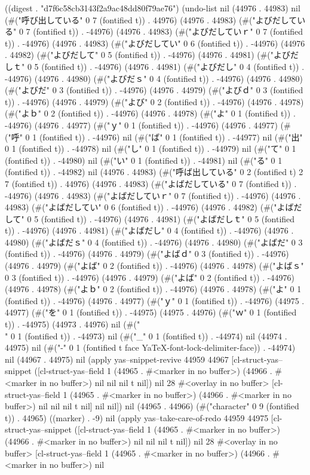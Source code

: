 
((digest . "d7f6c58cb3143f2a9ac48dd80f79ae76") (undo-list nil (44976 . 44983) nil (#("呼び出している" 0 7 (fontified t)) . 44976) (44976 . 44983) (#("よびだしている" 0 7 (fontified t)) . -44976) (44976 . 44983) (#("よびだしていｒ" 0 7 (fontified t)) . -44976) (44976 . 44983) (#("よびだしてい" 0 6 (fontified t)) . -44976) (44976 . 44982) (#("よびだして" 0 5 (fontified t)) . -44976) (44976 . 44981) (#("よびだしｔ" 0 5 (fontified t)) . -44976) (44976 . 44981) (#("よびだし" 0 4 (fontified t)) . -44976) (44976 . 44980) (#("よびだｓ" 0 4 (fontified t)) . -44976) (44976 . 44980) (#("よびだ" 0 3 (fontified t)) . -44976) (44976 . 44979) (#("よびｄ" 0 3 (fontified t)) . -44976) (44976 . 44979) (#("よび" 0 2 (fontified t)) . -44976) (44976 . 44978) (#("よｂ" 0 2 (fontified t)) . -44976) (44976 . 44978) (#("よ" 0 1 (fontified t)) . -44976) (44976 . 44977) (#("ｙ" 0 1 (fontified t)) . -44976) (44976 . 44977) (#("呼" 0 1 (fontified t)) . -44976) nil (#("ば" 0 1 (fontified t)) . -44977) nil (#("出" 0 1 (fontified t)) . -44978) nil (#("し" 0 1 (fontified t)) . -44979) nil (#("て" 0 1 (fontified t)) . -44980) nil (#("い" 0 1 (fontified t)) . -44981) nil (#("る" 0 1 (fontified t)) . -44982) nil (44976 . 44983) (#("呼ば出している" 0 2 (fontified t) 2 7 (fontified t)) . 44976) (44976 . 44983) (#("よばだしている" 0 7 (fontified t)) . -44976) (44976 . 44983) (#("よばだしていｒ" 0 7 (fontified t)) . -44976) (44976 . 44983) (#("よばだしてい" 0 6 (fontified t)) . -44976) (44976 . 44982) (#("よばだして" 0 5 (fontified t)) . -44976) (44976 . 44981) (#("よばだしｔ" 0 5 (fontified t)) . -44976) (44976 . 44981) (#("よばだし" 0 4 (fontified t)) . -44976) (44976 . 44980) (#("よばだｓ" 0 4 (fontified t)) . -44976) (44976 . 44980) (#("よばだ" 0 3 (fontified t)) . -44976) (44976 . 44979) (#("よばｄ" 0 3 (fontified t)) . -44976) (44976 . 44979) (#("よば" 0 2 (fontified t)) . -44976) (44976 . 44978) (#("よばｓ" 0 3 (fontified t)) . -44976) (44976 . 44979) (#("よば" 0 2 (fontified t)) . -44976) (44976 . 44978) (#("よｂ" 0 2 (fontified t)) . -44976) (44976 . 44978) (#("よ" 0 1 (fontified t)) . -44976) (44976 . 44977) (#("ｙ" 0 1 (fontified t)) . -44976) (44975 . 44977) (#("を" 0 1 (fontified t)) . -44975) (44975 . 44976) (#("ｗ" 0 1 (fontified t)) . -44975) (44973 . 44976) nil (#("\\" 0 1 (fontified t)) . -44973) nil (#("_" 0 1 (fontified t)) . -44974) nil (44974 . 44975) nil (#("-" 0 1 (fontified t face YaTeX-font-lock-delimiter-face)) . -44974) nil (44967 . 44975) nil (apply yas--snippet-revive 44959 44967 [cl-struct-yas--snippet ([cl-struct-yas--field 1 (44965 . #<marker in no buffer>) (44966 . #<marker in no buffer>) nil nil nil t nil]) nil 28 #<overlay in no buffer> [cl-struct-yas--field 1 (44965 . #<marker in no buffer>) (44966 . #<marker in no buffer>) nil nil nil t nil] nil nil]) nil (44965 . 44966) (#("character" 0 9 (fontified t)) . 44965) ((marker) . -9) nil (apply yas--take-care-of-redo 44959 44975 [cl-struct-yas--snippet ([cl-struct-yas--field 1 (44965 . #<marker in no buffer>) (44966 . #<marker in no buffer>) nil nil nil t nil]) nil 28 #<overlay in no buffer> [cl-struct-yas--field 1 (44965 . #<marker in no buffer>) (44966 . #<marker in no buffer>) nil 